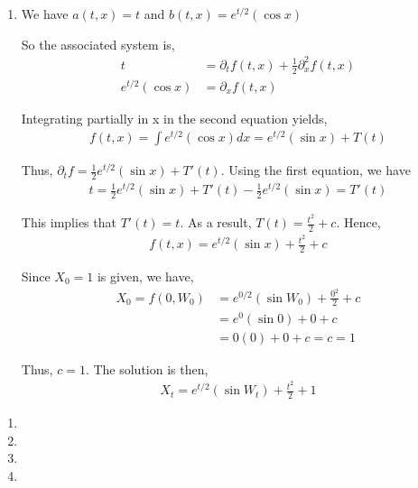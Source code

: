 \documentclass[12pt]{article}
\newenvironment{problem}[2][Problem]{\begin{trivlist}
\item[\hskip \labelsep {\bfseries #1}\hskip \labelsep {\bfseries #2.}]}{\end{trivlist}}
\begin{document}
\begin{enumerate}[\alph*)]
\item We have $a(t,x) = t$ and $b(t,x) = e^{t/2}(\cos x)$

So the associated system is,
\begin{align*}
t &= \partial_t f(t,x) + \frac{1}{2} \partial_x^2 f(t,x)\\
e^{t/2}(\cos x) &= \partial_x f(t,x)
\end{align*}

Integrating partially in x in the second equation yields,
\begin{align*}
f(t,x) = \int e^{t/2}(\cos x) dx = e^{t/2}(\sin x) + T(t)
\end{align*}

Thus, $\partial_t f = \frac{1}{2} e^{t/2}(\sin x) + T'(t)$. Using the first equation, we have
\begin{align*}
t = \frac{1}{2}e^{t/2}(\sin x) + T'(t) - \frac{1}{2}e^{t/2}(\sin x) = T'(t)
\end{align*}

This implies that $T'(t) = t$. As a result, $T(t) = \frac{t^2}{2} + c$. Hence,
\begin{align*}
f(t,x) = e^{t/2}(\sin x) + \frac{t^2}{2} + c
\end{align*}

Since $X_0 = 1$ is given, we have,
\begin{align*}
X_0 = f(0, W_0) &= e^{0/2}(\sin W_0) + \frac{0^2}{2} + c\\
&= e^0(\sin 0) + 0 + c\\
&= 0(0) + 0 + c = c = 1
\end{align*}

Thus, $c = 1$. The solution is then,
\begin{align*}
X_t = e^{t/2}(\sin W_t) + \frac{t^2}{2} + 1
\end{align*}

\end{enumerate}

\begin{problem}{28}
\end{problem}

\begin{enumerate}[\alph*)]

\item

\item

\item

\item

\end{enumerate}

\begin{problem}{29}
\end{problem}

\begin{problem}{30}
\end{problem}

\begin{problem}{31}
\end{problem}
\end{document}
